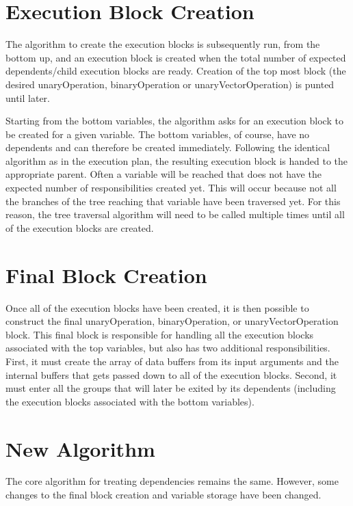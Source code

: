 \documentclass[11pt]{article}
\begin{document}
\section{Execution Block Creation}

The algorithm to create the execution blocks is subsequently run, from the bottom up, and an execution block is created when the total number of expected dependents/child execution blocks are ready. Creation of the top most block (the desired unaryOperation, binaryOperation or unaryVectorOperation) is punted until later.

Starting from the bottom variables, the algorithm asks for an execution block to be created for a given variable. The bottom variables, of course, have no dependents and can therefore be created immediately. Following the identical algorithm as in the execution plan, the resulting execution block is handed to the appropriate parent. Often a variable will be reached that does not have the expected number of responsibilities created yet. This will occur because not all the branches of the tree reaching that variable have been traversed yet. For this reason, the tree traversal algorithm will need to be called multiple times until all of the execution blocks are created.

\section{Final Block Creation}

Once all of the execution blocks have been created, it is then possible to construct the final unaryOperation, binaryOperation, or unaryVectorOperation block. This final block is responsible for handling all the execution blocks associated with the top variables, but also has two additional responsibilities. First, it must create the array of data buffers from its input arguments and the internal buffers that gets passed down to all of the execution blocks. Second, it must enter all the groups that will later be exited by its dependents (including the execution blocks associated with the bottom variables).

\section{New Algorithm}

The core algorithm for treating dependencies remains the same. However, some changes to the final block creation and variable storage have been changed.
\end{document}
